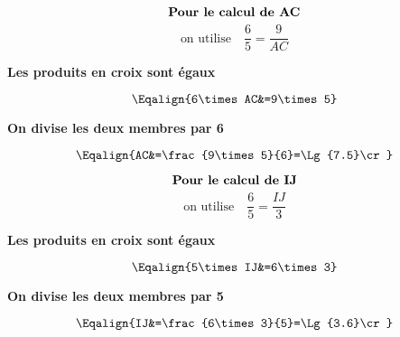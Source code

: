 \begin{methode*1}
            \begin{minipage}{8cm}
                $$\mbox{\bf Pour le calcul de AC}$$
                $$\mbox{on utilise} \quad \dfrac{6}{5}=\dfrac{9}{AC}$$
                \begin{center}
                    {\bf Les produits en croix sont égaux}
                \end{center}
                $$\Eqalign{6\times AC&=9\times5}$$
                \begin{center}
                    {\bf On divise les deux membres par 6}
                \end{center}
                $$\Eqalign{AC&=\frac{9\times5}{6}=\Lg{7.5}\cr}$$
            \end{minipage}
            \vrule
            \begin{minipage}{8cm}
                $$\mbox{\bf Pour le calcul de IJ}$$
                $$\mbox{on utilise} \quad \dfrac{6}{5}=\dfrac{IJ}{3}$$
                \begin{center}
                    {\bf Les produits en croix sont égaux}
                \end{center}
                $$\Eqalign{5\times IJ&=6\times3}$$
                \begin{center}
                    {\bf On divise les deux membres par 5}
                \end{center}
                $$\Eqalign{IJ&=\frac{6\times3}{5}=\Lg{3.6}\cr}$$
            \end{minipage}
        \end{methode*1}


    



